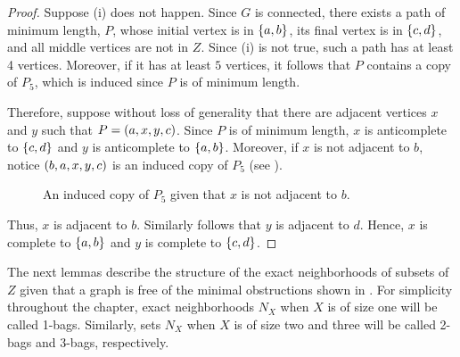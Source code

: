 \begin{proof}
    Suppose (i) does not happen. Since $G$ is connected, there exists a path of
    minimum length, $P$, whose initial vertex is in $\left\{a,b\right\}$, its final vertex
    is in $\left\{c,d\right\}$, and all middle vertices are not in $Z$. Since (i) is not
    true, such a path has at least 4 vertices. Moreover, if it has at least $5$
    vertices, it follows that $P$ contains a copy of $P_5$, which is induced
    since $P$ is of minimum length.

    Therefore, suppose without loss of generality that there are adjacent
    vertices $x$ and $y$ such that $P=\left(a,x,y,c\right)$. Since $P$ is of minimum
    length, $x$ is anticomplete to $\left\{c,d\right\}$ and $y$ is anticomplete to
    $\left\{a,b\right\}$. Moreover, if $x$ is not adjacent to $b$, notice $\left(b,a,x,y,c\right)$
    is an induced copy of $P_5$ (see ).

    \begin{figure}[htb!]
        \centering
        \caption{An induced copy of $P_5$ given that $x$ is not adjacent to $b$.}
        \label{fig:chordal_connectedness}
    \end{figure}
    
    Thus, $x$ is adjacent to $b$. Similarly follows that $y$ is adjacent to $d$.
    Hence, $x$ is complete to $\left\{a,b\right\}$ and $y$ is complete to $\left\{c,d\right\}$.

\end{proof}

The next lemmas describe the structure of the exact neighborhoods of subsets of
$Z$ given that a graph is free of the minimal obstructions shown in
. For simplicity throughout the chapter,
exact neighborhoods $N_X$ when $X$ is of size one will be called 1-bags.
Similarly, sets $N_X$ when $X$ is of size two and three will be called 2-bags
and 3-bags, respectively.

